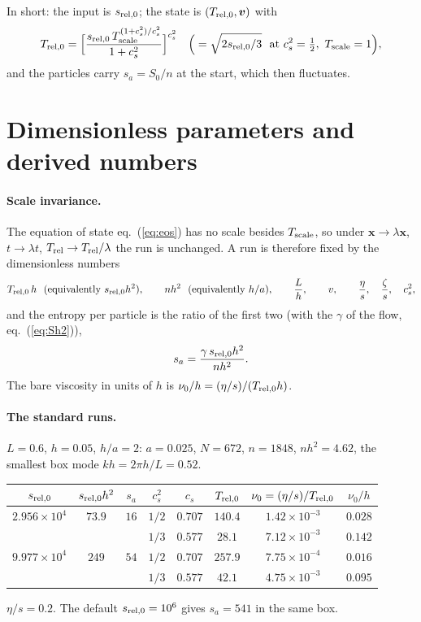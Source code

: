 \documentclass[11pt,aps,preprint,nofootinbib,superscriptaddress,tightenlines]{revtex4-2}
\def\st{\begin{equation}}
\def\stp{\end{equation}}
\def\Eq#1{eq.~(\ref{#1})}
\let\oldparagraph\paragraph
\renewcommand{\paragraph}{\par\bigskip\oldparagraph}
\begin{document}
In short: the input is $s_{\rm rel,0}$; the state is $(T_{\rm rel,0},\bm v)$ with
\st
T_{\rm rel,0}=\Big[\frac{s_{\rm rel,0}\,T_{\rm scale}^{(1+c_s^2)/c_s^2}}{1+c_s^2}\Big]^{c_s^2}
\quad\Big(=\sqrt{2s_{\rm rel,0}/3}\ \text{ at }c_s^2=\tfrac12,\ T_{\rm scale}=1\Big),
\label{eq:TofS}
\stp
and the particles carry $s_a=S_0/n$ at the start, which then fluctuates.

\section{Dimensionless parameters and derived numbers}
\label{sec:derived}

\paragraph{Scale invariance.}  The equation of state \Eq{eq:eos} has no scale besides $T_{\rm scale}$, so under $\bm x\to\lambda\bm x$,
$t\to\lambda t$, $T_{\rm rel}\to T_{\rm rel}/\lambda$ the run is unchanged.  A run is therefore fixed by the dimensionless numbers
\st
T_{\rm rel,0}\,h\ \ (\text{equivalently } s_{\rm rel,0}h^2),\qquad nh^2\ \ (\text{equivalently } h/a),\qquad \frac Lh,\qquad v,\qquad \frac\eta s,\quad \frac\zeta s,\quad c_s^2 ,
\label{eq:dimless}
\stp
and the entropy per particle is the ratio of the first two (with the $\gamma$ of the flow, \Eq{eq:Sh2}),
\st
s_a=\frac{\gamma\,s_{\rm rel,0}h^2}{nh^2} .
\label{eq:saratio}
\stp
The bare viscosity in units of $h$ is $\nu_0/h=(\eta/s)/(T_{\rm rel,0}h)$.

\paragraph{The standard runs.}  $L=0.6$, $h=0.05$, $h/a=2$: $a=0.025$, $N=672$, $n=1848$, $nh^2=4.62$, the smallest box mode
$kh=2\pi h/L=0.52$.
\begin{center}
\begin{tabular}{cccccccc}
\toprule
$s_{\rm rel,0}$ & $s_{\rm rel,0}h^2$ & $s_a$ & $c_s^2$ & $c_s$ & $T_{\rm rel,0}$ & $\nu_0=(\eta/s)/T_{\rm rel,0}$ & $\nu_0/h$ \\ \midrule
$2.956\times10^4$ & $73.9$ & $16$ & $1/2$ & $0.707$ & $140.4$ & $1.42\times10^{-3}$ & $0.028$ \\
                  &        &      & $1/3$ & $0.577$ & $28.1$  & $7.12\times10^{-3}$ & $0.142$ \\
$9.977\times10^4$ & $249$  & $54$ & $1/2$ & $0.707$ & $257.9$ & $7.75\times10^{-4}$ & $0.016$ \\
                  &        &      & $1/3$ & $0.577$ & $42.1$  & $4.75\times10^{-3}$ & $0.095$ \\
\bottomrule
\end{tabular}
\end{center}
$\eta/s=0.2$.  The default $s_{\rm rel,0}=10^6$ gives $s_a=541$ in the same box.
\end{document}
